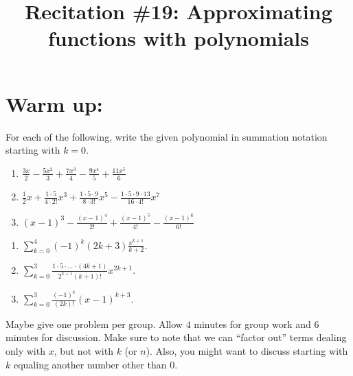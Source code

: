 \documentclass[handout]{ximera}
\title{Recitation \#19: Approximating functions with polynomials}
\begin{document}
\begin{abstract}		\end{abstract}
\maketitle



\section{Warm up:}
For each of the following, write the given polynomial in summation notation starting with $k=0$.
	\begin{enumerate}
	
	\item  $\frac{3x}{2} - \frac{5x^2}{3} + \frac{7x^3}{4} - \frac{9x^4}{5} + \frac{11x^5}{6}$
	
	\item  $\frac{1}{2}x + \frac{1 \cdot 5}{4 \cdot 2!}x^3 + \frac{1 \cdot 5 \cdot 9}{8 \cdot 3!}x^5 - \frac{1 \cdot 5 \cdot 9 \cdot 13}{16 \cdot 4!}x^7$
	
	\item  $(x-1)^3 - \frac{(x-1)^4}{2!} + \frac{(x-1)^5}{4!} - \frac{(x-1)^6}{6!} $
	
	\end{enumerate}
	
	\begin{freeResponse}
	\begin{enumerate}
	
	\item  $\sum_{k=0}^4 (-1)^k (2k+3) \frac{x^{k+1}}{k+2}$.  
	
	\item  $\sum_{k=0}^3 \frac{1 \cdot 5 \cdot \hdots \cdot (4k+1)}{2^{k+1} (k+1)!} x^{2k+1}.$
	
	\item  $\sum_{k=0}^3 \frac{(-1)^k}{(2k)!} (x-1)^{k+3}$.  
	
	\end{enumerate}
	\end{freeResponse}
	
\begin{instructorNotes}
Maybe give one problem per group.  
Allow $4$ minutes for group work and $6$ minutes for discussion.  
Make sure to note that we can ``factor out'' terms dealing only with $x$, but not with $k$ (or $n$).  
Also, you might want to discuss starting with $k$ equaling another number other than $0$.
\end{instructorNotes}
\end{document}
